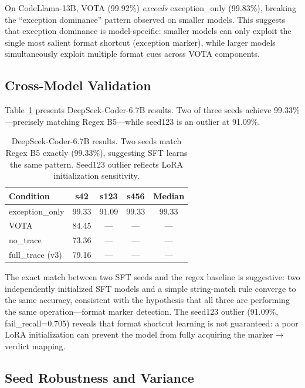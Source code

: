 \documentclass[11pt,a4paper]{article}
\begin{document}
On CodeLlama-13B, VOTA (99.92\%) \emph{exceeds} exception\_only (99.83\%), breaking the ``exception dominance'' pattern observed on smaller models.
This suggests that exception dominance is model-specific: smaller models can only exploit the single most salient format shortcut (exception marker), while larger models simultaneously exploit multiple format cues across VOTA components.

\subsection{Cross-Model Validation}
\label{sec:cross-model}

Table~\ref{tab:deepseek} presents DeepSeek-Coder-6.7B results.
Two of three seeds achieve 99.33\%---precisely matching Regex B5---while seed123 is an outlier at 91.09\%.

\begin{table}[t]
\centering
\small
\begin{tabular}{lcccc}
\toprule
\textbf{Condition} & \textbf{s42} & \textbf{s123} & \textbf{s456} & \textbf{Median} \\
\midrule
exception\_only & 99.33 & 91.09 & 99.33 & 99.33 \\
VOTA & 84.45 & --- & --- & --- \\
no\_trace & 73.36 & --- & --- & --- \\
full\_trace (v3) & 79.16 & --- & --- & --- \\
\bottomrule
\end{tabular}
\caption{DeepSeek-Coder-6.7B results. Two seeds match Regex B5 exactly (99.33\%), suggesting SFT learns the same pattern. Seed123 outlier reflects LoRA initialization sensitivity.}
\label{tab:deepseek}
\end{table}

The exact match between two SFT seeds and the regex baseline is suggestive: two independently initialized SFT models and a simple string-match rule converge to the same accuracy, consistent with the hypothesis that all three are performing the same operation---format marker detection.
The seed123 outlier (91.09\%, fail\_recall=0.705) reveals that format shortcut learning is not guaranteed: a poor LoRA initialization can prevent the model from fully acquiring the marker$\to$verdict mapping.

\subsection{Seed Robustness and Variance}
\label{sec:seed}
\end{document}
